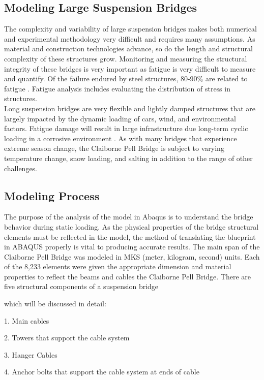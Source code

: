 \subsection{Modeling Large Suspension Bridges}
The complexity and variability of large suspension bridges makes both numerical and experimental methodology very difficult and requires many assumptions. As material and construction technologies advance, so do the length and structural complexity of these structures grow. Monitoring and measuring the structural integrity of these bridges is very important as fatigue is very difficult to measure and quantify. Of the failure endured by steel structures, 80-90\% are related to fatigue \cite{Chan}. Fatigue analysis includes evaluating the distribution of stress in structures.\\
\indent Long suspension bridges are very flexible and lightly damped structures that are largely impacted by the dynamic loading of cars, wind, and environmental factors. Fatigue damage will result in large infrastructure due long-term cyclic loading in a corrosive environment \cite{Chan,Guo,Li:2003}. As with many bridges that experience extreme season change, the Claiborne Pell Bridge is subject to varying temperature change, snow loading, and salting in addition to the range of other challenges. 


\subsection{Modeling Process}

The purpose of the analysis of the model in Abaqus is to understand the bridge behavior during static loading. As the physical properties of the bridge structural elements must be reflected in the model, the method of translating the blueprint in ABAQUS properly is vital to producing accurate results. The main span of the Claiborne Pell Bridge was modeled in MKS (meter, kilogram, second) units. Each of the 8,233 elements were given the appropriate dimension and material properties to reflect the beams and cables the Claiborne Pell Bridge. There are five structural components of a suspension bridge 

which will be discussed in detail:

1. Main cables

2. Towers that support the cable system

3. Hanger Cables

4. Anchor bolts that support the cable system at ends of cable

